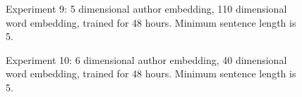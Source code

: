 \documentclass{article}%
\begin{document}
\begin{figure}
\noindent{}
\caption{Experiment 9: 5 dimensional author embedding, 110 dimensional word embedding, trained for 48 hours. Minimum sentence length is 5.}
\end{figure}
\begin{figure}
\noindent{}
\caption{Experiment 10: 6 dimensional author embedding, 40 dimensional word embedding, trained for 48 hours. Minimum sentence length is 5.}
\end{figure}
\end{document}
